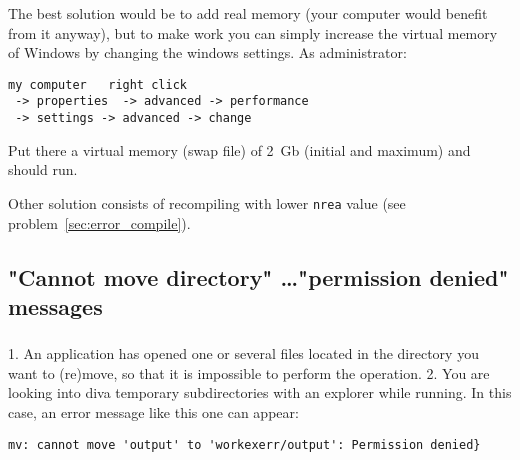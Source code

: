 \subsubsection{\answer}

The best solution would be to 
add real memory (your computer would benefit from it anyway), but to 
make \diva work you can simply increase the virtual memory of Windows by 
changing the windows settings. As administrator:\\

\begin{verbatim}
my computer   right click
 -> properties  -> advanced -> performance
 -> settings -> advanced -> change
\end{verbatim}

Put there a virtual memory (swap file) of 2~Gb (initial and maximum) and 
\diva should run. 

Other solution consists of recompiling with lower \texttt{nrea} value (see problem~\ref{sec:error_compile}).


\subsection{"Cannot move directory" \ldots "permission denied" messages}



\subsubsection{\question}

1. An application has opened one or several files located in the directory you want to (re)move, so that it is impossible to perform the operation.
2. You are looking into diva temporary subdirectories with an explorer while running. In this case, an error message like this one can appear: 

\begin{verbatim}
mv: cannot move 'output' to 'workexerr/output': Permission denied}
\end{verbatim}

\subsubsection{\answer}

